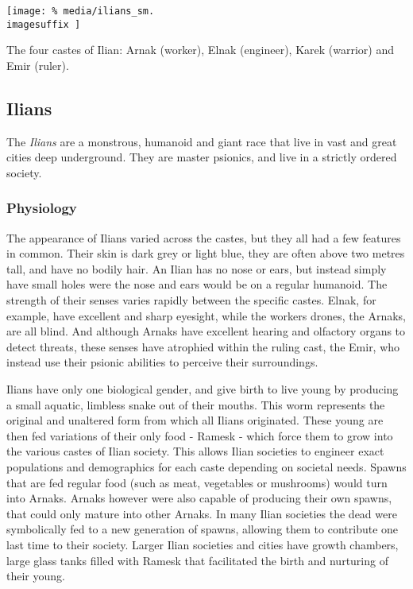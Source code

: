 \ifimages
\begin{figure*}[ht!]
  \centering
  \vspace{-2.6cm}
  \centerline{
    \texttt{[image: \%
      media/ilians\_sm.\\imagesuffix
    ]}
  }
  \par
  The four castes of Ilian: Arnak (worker), Elnak (engineer), Karek
  (warrior) and Emir (ruler).
\end{figure*}
\fi

\subsection{Ilians}
\label{sec:Ilians}

The \emph{Ilians} are a monstrous, humanoid and giant race that live in vast
and great cities deep underground. They are master psionics, and live in a
strictly ordered society.

\subsubsection{Physiology}

The appearance of Ilians varied across the castes, but they all had a few
features in common. Their skin is dark grey or light blue, they are often
above two metres tall, and have no bodily hair. An Ilian has no nose or ears,
but instead simply have small holes were the nose and ears would be on a
regular humanoid. The strength of their senses varies rapidly between the
specific castes. Elnak, for example, have excellent and sharp eyesight, while
the workers drones, the Arnaks, are all blind. And although Arnaks have
excellent hearing and olfactory organs to detect threats, these senses have
atrophied within the ruling cast, the Emir, who instead use their psionic
abilities to perceive their surroundings.

Ilians have only one biological gender, and give birth to live young by
producing a small aquatic, limbless snake out of their mouths. This worm
represents the original and unaltered form from which all Ilians
originated. These young are then fed variations of their only food - Ramesk -
which force them to grow into the various castes of Ilian society. This allows
Ilian societies to engineer exact populations and demographics for each caste
depending on societal needs. Spawns that are fed regular food (such as meat,
vegetables or mushrooms) would turn into Arnaks. Arnaks however were also
capable of producing their own spawns, that could only mature into other
Arnaks. In many Ilian societies the dead were symbolically fed to a new
generation of spawns, allowing them to contribute one last time to their
society. Larger Ilian societies and cities have growth chambers, large glass
tanks filled with Ramesk that facilitated the birth and nurturing of their
young.

